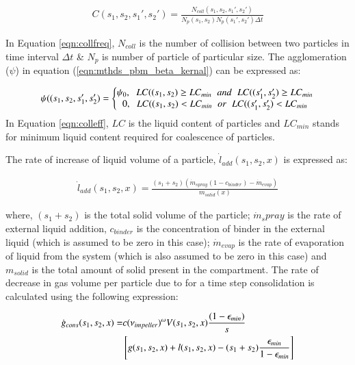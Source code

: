 \documentclass[preprint,11pt,authoryear]{elsarticle}
\begin{document}
\begin{align}
C(s_1,s_2,s_1',s_2')=\frac{N_{coll}(s_1,s_2,s_1',s_2')}{N_p(s_1,s_2)N_p(s_1',s_2')\Delta t}
\label{eqn:collfreq}
\end{align}

In Equation \ref{eqn:collfreq}, $N_{coll}$ is the number of collision between two particles in 
time interval $\Delta t$ \& $N_p$ is number of particle of particular size. The agglomeration 
($\psi$) in equation (\ref{eqn:mthds_pbm_beta_kernal}) can be expressed as:

\begin{align}
\psi((s_1,s_2,s_1',s_2') = 
\left\{\begin{matrix}
\psi_0,\hspace{0.2cm} LC((s_1,s_2) \geq LC_{min}\hspace{0.2cm} and\hspace{0.2cm} LC((s_1',s_2') \geq LC_{min}	\\ 
0,\hspace{0.2cm} LC((s_1,s_2) < LC_{min}\hspace{0.2cm} or\hspace{0.2cm} LC((s_1',s_2') < LC_{min}
\end{matrix}\right.
\label{eqn:colleff}
\end{align}
 In Equation \ref{eqn:colleff}, $LC$ is the liquid content of particles and $LC_{min}$ stands for minimum 
 liquid content required for coalescence of particles. 

The rate of increase of liquid volume of a particle, $\dot{l}_{add}(s_1,s_2,x)$ is expressed as:

\begin{align}
\dot{l}_{add}(s_1,s_2,x) = \frac{(s_1+s_2)(\dot{m}_{spray}(1-c_{binder})-\dot{m}_{evap})}{m_{solid}(x)}
\end{align}

where, $(s_1+s_2)$  is the total solid volume of the particle; $\dot{m}_spray$ is the rate of external 
liquid addition, $c_{binder}$ is the concentration of binder in the external liquid (which is assumed to 
be zero in this case); $\dot{m}_{evap}$ is the rate of evaporation of liquid from 
the system (which is also assumed to be zero in this case) and $m_{solid}$ is the total amount of solid 
present in the compartment.
The rate of decrease in gas volume per particle due to for a time step consolidation is calculated using the 
following expression: \citep{Verkoeijen2002} 

\begin{align}
\dot{g}_{cons}(s_1,s_2,x)=&c (\nu_{impeller})^{\omega}V(s_1,s_2,x)\frac{(1-\epsilon_{min})}{s} 
\notag \\ 
& \left[g(s_1,s_2,x)+l(s_1,s_2,x) -(s_1+s_2)\frac{\epsilon_{min}}{1-\epsilon_{min}}\right]
\end{align}        
\end{document}
